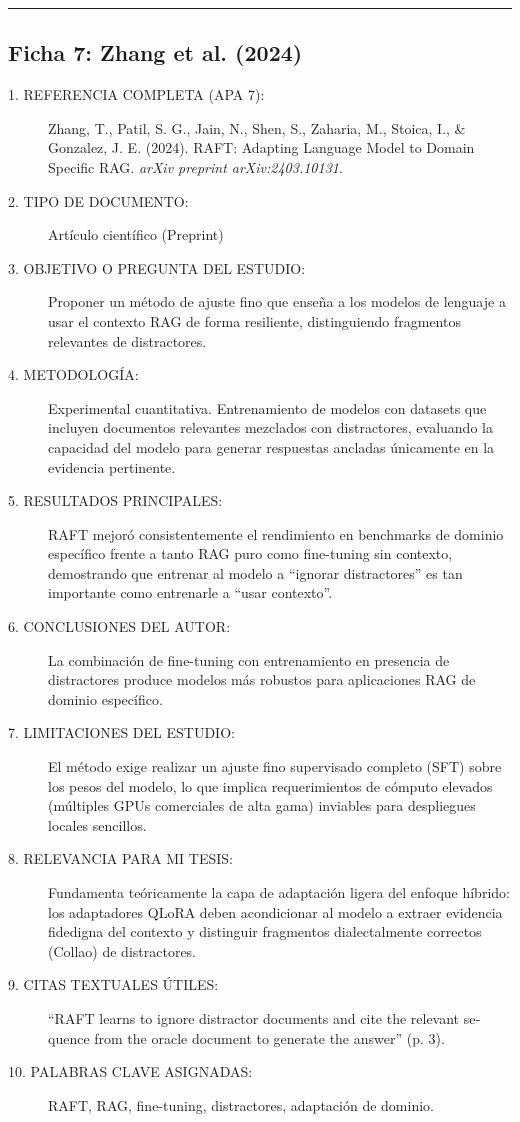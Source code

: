 \vspace{0.5cm}
\hrule
\vspace{0.5cm}

\subsection*{Ficha 7: Zhang et al. (2024)}
\begin{description}
	\item[1. REFERENCIA COMPLETA (APA 7):] Zhang, T., Patil, S. G., Jain, N., Shen, S., Zaharia, M., Stoica, I., \& Gonzalez, J. E. (2024). RAFT: Adapting Language Model to Domain Specific RAG. \textit{arXiv preprint arXiv:2403.10131}.
	\item[2. TIPO DE DOCUMENTO:] Artículo científico (Preprint)
	\item[3. OBJETIVO O PREGUNTA DEL ESTUDIO:] Proponer un método de ajuste fino que enseña a los modelos de lenguaje a usar el contexto RAG de forma resiliente, distinguiendo fragmentos relevantes de distractores.
	\item[4. METODOLOGÍA:] Experimental cuantitativa. Entrenamiento de modelos con datasets que incluyen documentos relevantes mezclados con distractores, evaluando la capacidad del modelo para generar respuestas ancladas únicamente en la evidencia pertinente.
	\item[5. RESULTADOS PRINCIPALES:] RAFT mejoró consistentemente el rendimiento en benchmarks de dominio específico frente a tanto RAG puro como fine-tuning sin contexto, demostrando que entrenar al modelo a ``ignorar distractores'' es tan importante como entrenarle a ``usar contexto''.
	\item[6. CONCLUSIONES DEL AUTOR:] La combinación de fine-tuning con entrenamiento en presencia de distractores produce modelos más robustos para aplicaciones RAG de dominio específico.
	\item[7. LIMITACIONES DEL ESTUDIO:] El método exige realizar un ajuste fino supervisado completo (SFT) sobre los pesos del modelo, lo que implica requerimientos de cómputo elevados (múltiples GPUs comerciales de alta gama) inviables para despliegues locales sencillos.
	\item[8. RELEVANCIA PARA MI TESIS:] Fundamenta teóricamente la capa de adaptación ligera del enfoque híbrido: los adaptadores QLoRA deben acondicionar al modelo a extraer evidencia fidedigna del contexto y distinguir fragmentos dialectalmente correctos (Collao) de distractores.
	\item[9. CITAS TEXTUALES ÚTILES:] \foreignlanguage{english}{``RAFT learns to ignore distractor documents and cite the relevant sequence from the oracle document to generate the answer''} (p. 3).
	\item[10. PALABRAS CLAVE ASIGNADAS:] RAFT, RAG, fine-tuning, distractores, adaptación de dominio.
\end{description}

